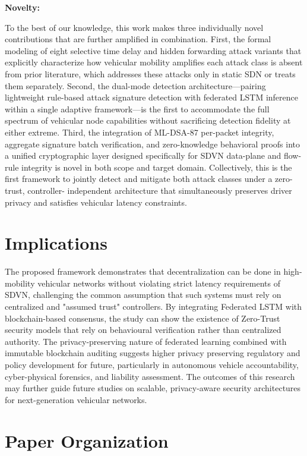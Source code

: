 \documentclass[12pt, a4paper]{report}
\begin{document}
\textbf{Novelty:} 

To the best of our knowledge, this work makes three individually novel
contributions that are further amplified in combination. First, the
formal modeling of eight selective time delay and hidden forwarding attack
variants that explicitly characterize how vehicular mobility amplifies
each attack class is absent from prior literature, which addresses these
attacks only in static SDN or treats them separately. Second, the
dual-mode detection architecture---pairing lightweight rule-based attack
signature detection with federated LSTM inference within a single
adaptive framework---is the first to accommodate the full spectrum of
vehicular node capabilities without sacrificing detection fidelity at
either extreme. Third, the integration of ML-DSA-87 per-packet integrity,
aggregate signature batch verification, and zero-knowledge behavioral
proofs into a unified cryptographic layer designed specifically for
SDVN data-plane and flow-rule integrity is novel in both scope and
target domain. Collectively, this is the first framework to jointly
detect and mitigate both attack classes under a zero-trust, controller-
independent architecture that simultaneously preserves driver privacy
and satisfies vehicular latency constraints.



\section{Implications}
The proposed framework demonstrates that decentralization can be done in high-mobility vehicular networks without violating strict latency requirements of SDVN, challenging the common assumption that such systems must rely on centralized and "assumed  trust" controllers. By integrating Federated LSTM with blockchain-based consensus, the study can show the existence of Zero-Trust security models that rely on behavioural verification rather than centralized authority. The privacy-preserving nature of federated learning combined with immutable blockchain auditing suggests higher privacy preserving regulatory and policy development for future, particularly in autonomous vehicle accountability, cyber-physical forensics, and liability assessment. The outcomes of this research may further guide future studies on scalable, privacy-aware security architectures for next-generation vehicular networks.

\section{Paper Organization}
\end{document}
